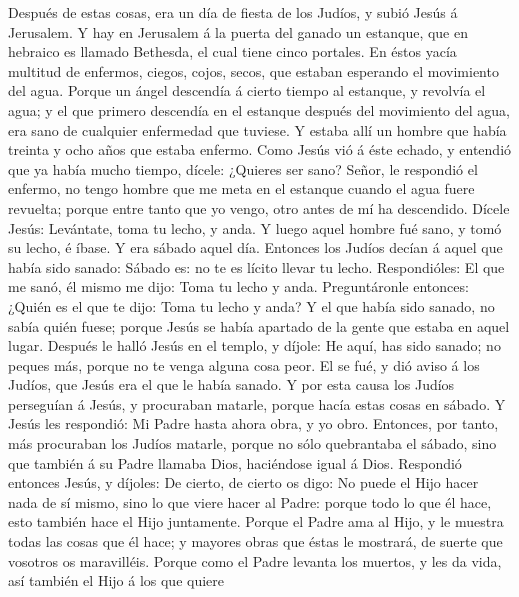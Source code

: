  Después de estas cosas, era un día de fiesta de los Judíos,
y subió Jesús á Jerusalem.  Y hay en Jerusalem á la puerta
del ganado un estanque, que en hebraico es llamado Bethesda, el cual
tiene cinco portales.  En éstos yacía multitud de enfermos,
ciegos, cojos, secos, que estaban esperando el movimiento del agua.
 Porque un ángel descendía á cierto tiempo al estanque, y
revolvía el agua; y el que primero descendía en el estanque después del
movimiento del agua, era sano de cualquier enfermedad que tuviese.
 Y estaba allí un hombre que había treinta y ocho años que
estaba enfermo.  Como Jesús vió á éste echado, y entendió
que ya había mucho tiempo, dícele: ¿Quieres ser sano? 
Señor, le respondió el enfermo, no tengo hombre que me meta en el
estanque cuando el agua fuere revuelta; porque entre tanto que yo vengo,
otro antes de mí ha descendido.  Dícele Jesús: Levántate,
toma tu lecho, y anda.  Y luego aquel hombre fué sano, y
tomó su lecho, é íbase. Y era sábado aquel día.  Entonces
los Judíos decían á aquel que había sido sanado: Sábado es: no te es
lícito llevar tu lecho.  Respondióles: El que me sanó, él
mismo me dijo: Toma tu lecho y anda.  Preguntáronle
entonces: ¿Quién es el que te dijo: Toma tu lecho y anda? 
Y el que había sido sanado, no sabía quién fuese; porque Jesús se había
apartado de la gente que estaba en aquel lugar.  Después le
halló Jesús en el templo, y díjole: He aquí, has sido sanado; no peques
más, porque no te venga alguna cosa peor.  El se fué, y dió
aviso á los Judíos, que Jesús era el que le había sanado. 
Y por esta causa los Judíos perseguían á Jesús, y procuraban matarle,
porque hacía estas cosas en sábado.  Y Jesús les respondió:
Mi Padre hasta ahora obra, y yo obro.  Entonces, por tanto,
más procuraban los Judíos matarle, porque no sólo quebrantaba el sábado,
sino que también á su Padre llamaba Dios, haciéndose igual á Dios.
 Respondió entonces Jesús, y díjoles: De cierto, de cierto
os digo: No puede el Hijo hacer nada de sí mismo, sino lo que viere
hacer al Padre: porque todo lo que él hace, esto también hace el Hijo
juntamente.  Porque el Padre ama al Hijo, y le muestra
todas las cosas que él hace; y mayores obras que éstas le mostrará, de
suerte que vosotros os maravilléis.  Porque como el Padre
levanta los muertos, y les da vida, así también el Hijo á los que quiere
